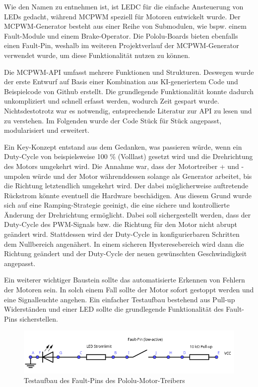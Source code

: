 Wie den Namen zu entnehmen ist, ist LEDC für die einfache Ansteuerung von LEDs gedacht, während MCPWM speziell für Motoren entwickelt wurde. Der MCPWM-Generator besteht aus einer Reihe von Submodulen, wie bspw. einem Fault-Module und einem Brake-Operator. Die Pololu-Boards bieten ebenfalls einen Fault-Pin, weshalb im weiteren Projektverlauf der MCPWM-Generator verwendet wurde, um diese Funktionalität nutzen zu können. \newline

Die MCPWM-API umfasst mehrere Funktionen und Strukturen. Deswegen wurde der erste Entwurf auf Basis einer Kombination aus KI-generiertem Code und Beispielcode von Github erstellt. Die grundlegende Funktionalität konnte dadurch unkompliziert und schnell erfasst werden, wodurch Zeit gespart wurde. Nichtsdestotrotz war es notwendig, entsprechende Literatur zur API zu lesen und zu verstehen. Im Folgenden wurde der Code Stück für Stück angepasst, modularisiert und erweitert. \newline

Ein Key-Konzept entstand aus dem Gedanken, was passieren würde, wenn ein Duty-Cycle von beispielsweise 100 \% (Volllast) gesetzt wird und die Drehrichtung des Motors umgekehrt wird. Die Annahme war, dass der Motortreiber + und - umpolen würde und der Motor währenddessen solange als Generator arbeitet, bis die Richtung letztendlich umgekehrt wird. Der dabei möglicherweise auftretende Rückstrom könnte eventuell die Hardware beschädigen. Aus diesem Grund wurde sich auf eine Ramping-Strategie geeinigt, die eine sichere und kontrollierte Änderung der Drehrichtung ermöglicht. Dabei soll sichergestellt werden, dass der Duty-Cycle des PWM-Signals bzw. die Richtung für den Motor nicht abrupt geändert wird. Stattdessen wird der Duty-Cycle in konfigurierbaren Schritten dem Nullbereich angenähert. In einem sicheren Hysteresebereich wird dann die Richtung geändert und der Duty-Cycle der neuen gewünschten Geschwindigkeit angepasst. \newline

Ein weiterer wichtiger Baustein sollte das automatisierte Erkennen von Fehlern der Motoren sein. In solch einem Fall sollte der Motor sofort gestoppt werden und eine Signalleuchte angehen. Ein einfacher Testaufbau bestehend aus Pull-up Widerständen und einer LED sollte die grundlegende Funktionalität des Fault-Pins sicherstellen.

\begin{figure}[h]
    \centering
    \includegraphics[width=\textwidth]{images/motor_driver_fault_pin.png}
    \caption{Testaufbau des Fault-Pins des Pololu-Motor-Treibers}
    \label{fig:motor_driver_fault_pin}
\end{figure}

